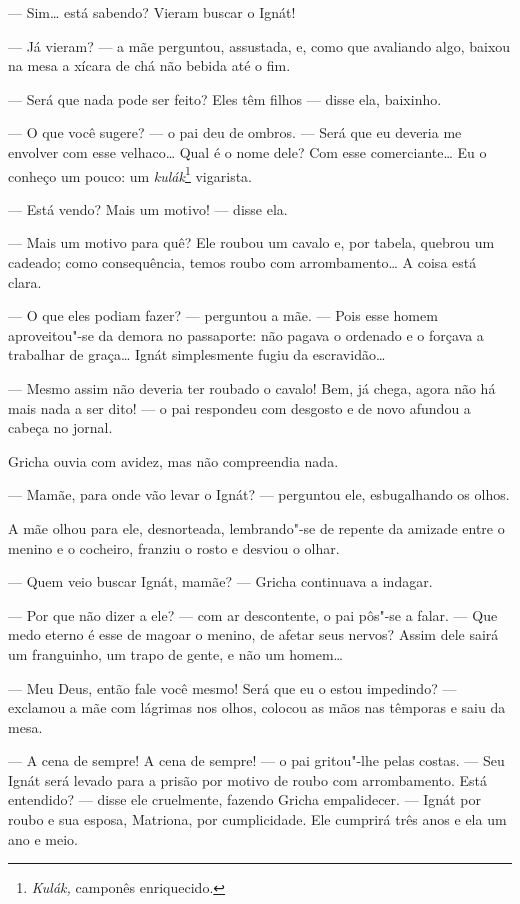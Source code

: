 --- Sim\ldots{} está sabendo? Vieram buscar o Ignát!

--- Já vieram? --- a mãe perguntou, assustada, e, como que avaliando
algo, baixou na mesa a xícara de chá não bebida até o fim.

--- Será que nada pode ser feito? Eles têm filhos --- disse ela,
baixinho.

--- O que você sugere? --- o pai deu de ombros. --- Será que eu deveria
me envolver com esse velhaco\ldots{} Qual é o nome dele? Com esse
comerciante\ldots{} Eu o conheço um pouco: um \emph{kulák}\footnote{\emph{Kulák,}
  camponês enriquecido.} vigarista.

--- Está vendo? Mais um motivo! --- disse ela.

--- Mais um motivo para quê? Ele roubou um cavalo e, por tabela, quebrou
um cadeado; como consequência, temos roubo com arrombamento\ldots{} A coisa
está clara.

--- O que eles podiam fazer? --- perguntou a mãe. --- Pois esse homem
aproveitou"-se da demora no passaporte: não pagava o ordenado e o forçava
a trabalhar de graça\ldots{} Ignát simplesmente fugiu da escravidão\ldots{}

--- Mesmo assim não deveria ter roubado o cavalo! Bem, já chega, agora
não há mais nada a ser dito! --- o pai respondeu com desgosto e de novo
afundou a cabeça no jornal.

Gricha ouvia com avidez, mas não compreendia nada.

--- Mamãe, para onde vão levar o Ignát? --- perguntou ele, esbugalhando
os olhos.

A mãe olhou para ele, desnorteada, lembrando"-se de repente da amizade
entre o menino e o cocheiro, franziu o rosto e desviou o olhar.

--- Quem veio buscar Ignát, mamãe? --- Gricha continuava a indagar.

--- Por que não dizer a ele? --- com ar descontente, o pai pôs"-se a
falar. --- Que medo eterno é esse de magoar o menino, de afetar seus nervos? Assim dele sairá um franguinho, um trapo de gente, e não um
homem\ldots{}

--- Meu Deus, então fale você mesmo! Será que eu o estou impedindo? ---
exclamou a mãe com lágrimas nos olhos, colocou as mãos nas têmporas e
saiu da mesa.

--- A cena de sempre! A cena de sempre! --- o pai gritou"-lhe pelas
costas. --- Seu Ignát será levado para a prisão por motivo de roubo com
arrombamento. Está entendido? --- disse ele cruelmente, fazendo Gricha
empalidecer. --- Ignát por roubo e sua esposa, Matriona, por
cumplicidade. Ele cumprirá três anos e ela um ano e meio.

